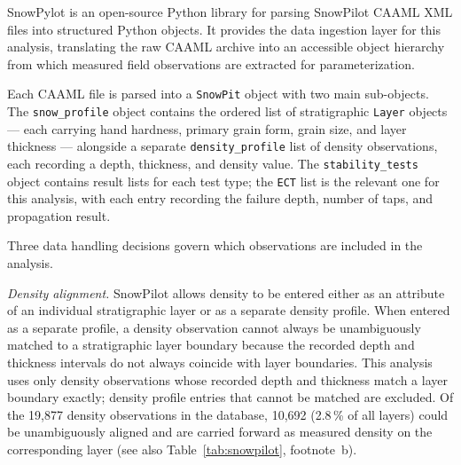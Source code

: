 \documentclass[hess, manuscript]{copernicus}
\begin{document}

SnowPylot \citep{connelly2025} is an open-source Python library for parsing SnowPilot CAAML XML files into structured Python objects. It provides the data ingestion layer for this analysis, translating the raw CAAML archive into an accessible object hierarchy from which measured field observations are extracted for parameterization.


Each CAAML file is parsed into a \texttt{SnowPit} object with two main sub-objects. The \texttt{snow\_profile} object contains the ordered list of stratigraphic \texttt{Layer} objects --- each carrying hand hardness, primary grain form, grain size, and layer thickness --- alongside a separate \texttt{density\_profile} list of density observations, each recording a depth, thickness, and density value. The \texttt{stability\_tests} object contains result lists for each test type; the \texttt{ECT} list is the relevant one for this analysis, with each entry recording the failure depth, number of taps, and propagation result.


Three data handling decisions govern which observations are included in the analysis.

\textit{Density alignment.} SnowPilot allows density to be entered either as an attribute of an individual stratigraphic layer or as a separate density profile. When entered as a separate profile, a density observation cannot always be unambiguously matched to a stratigraphic layer boundary because the recorded depth and thickness intervals do not always coincide with layer boundaries. This analysis uses only density observations whose recorded depth and thickness match a layer boundary exactly; density profile entries that cannot be matched are excluded. Of the 19{,}877 density observations in the database, 10{,}692 (2.8\,\% of all layers) could be unambiguously aligned and are carried forward as measured density on the corresponding layer (see also Table~\ref{tab:snowpilot}, footnote~b).
\end{document}
